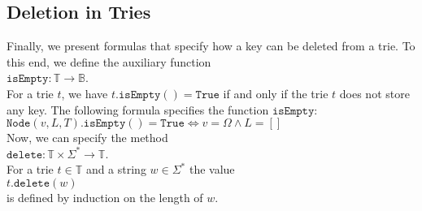 \subsection{Deletion in Tries}
Finally, we present formulas that specify how a key can be deleted from a trie.
To this end, we define the auxiliary function
\\[0.2cm]
\hspace*{1.3cm} 
$\texttt{isEmpty}: \mathbb{T} \rightarrow \mathbb{B}$.
\\[0.2cm]
For a trie $t$, we have $t.\texttt{isEmpty}() = \texttt{True}$ if and only if the trie $t$ does not
store any key.  The following formula specifies the function $\texttt{isEmpty}$:
\\[0.2cm]
\hspace*{1.3cm}
$\texttt{Node}(v, L, T).\texttt{isEmpty}() = \mathtt{True} \Leftrightarrow v = \Omega \wedge L = []$
\\[0.2cm]
Now, we can specify the method
\\[0.2cm]
\hspace*{1.3cm}
$\texttt{delete}: \mathbb{T} \times \Sigma^* \rightarrow \mathbb{T}$.
\\[0.2cm]
For a trie  $t \in \mathbb{T}$ and a string $w \in \Sigma^*$ the value 
 \\[0.2cm]
\hspace*{1.3cm} 
$t.\texttt{delete}(w)$
\\[0.2cm]
is defined by induction on the length of  $w$.
